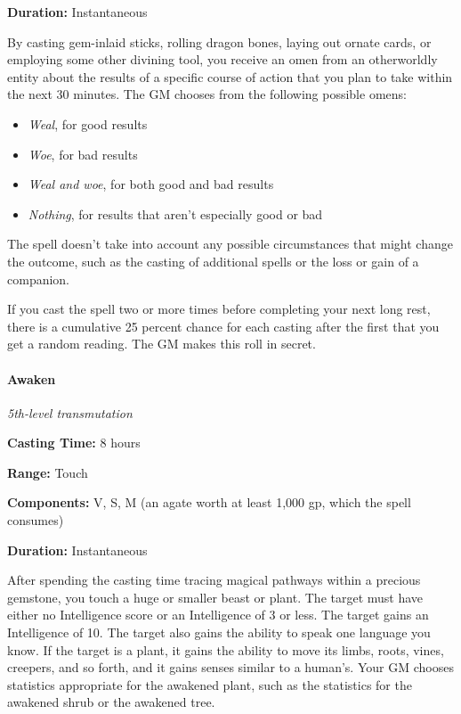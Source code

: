 \documentclass[
]{article}
\providecommand{\tightlist}{%
  \setlength{\itemsep}{0pt}\setlength{\parskip}{0pt}}
\begin{document}
\textbf{Duration:} Instantaneous

By casting gem-inlaid sticks, rolling dragon bones, laying out ornate
cards, or employing some other divining tool, you receive an omen from
an otherworldly entity about the results of a specific course of action
that you plan to take within the next 30 minutes. The GM chooses from
the following possible omens:

\begin{itemize}
\tightlist
\item
  \emph{Weal}, for good results
\item
  \emph{Woe}, for bad results
\item
  \emph{Weal and woe}, for both good and bad results
\item
  \emph{Nothing}, for results that aren't especially good or bad
\end{itemize}

The spell doesn't take into account any possible circumstances that
might change the outcome, such as the casting of additional spells or
the loss or gain of a companion.

If you cast the spell two or more times before completing your next long
rest, there is a cumulative 25 percent chance for each casting after the
first that you get a random reading. The GM makes this roll in secret.

\hypertarget{awaken}{%
\paragraph{Awaken}\label{awaken}}

\emph{5th-level transmutation}

\textbf{Casting Time:} 8 hours

\textbf{Range:} Touch

\textbf{Components:} V, S, M (an agate worth at least 1,000 gp, which
the spell consumes)

\textbf{Duration:} Instantaneous

After spending the casting time tracing magical pathways within a
precious gemstone, you touch a huge or smaller beast or plant. The
target must have either no Intelligence score or an Intelligence of 3 or
less. The target gains an Intelligence of 10. The target also gains the
ability to speak one language you know. If the target is a plant, it
gains the ability to move its limbs, roots, vines, creepers, and so
forth, and it gains senses similar to a human's. Your GM chooses
statistics appropriate for the awakened plant, such as the statistics
for the awakened shrub or the awakened tree.
\end{document}
